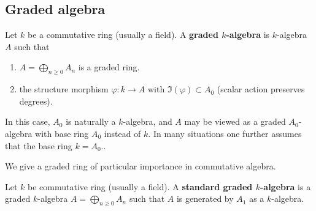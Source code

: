 \subsection{Graded algebra} %
\begin{definition}
    Let $k$ be a commutative ring (usually a field).
    A \textbf{graded $k$-algebra} is $k$-algebra $A$ such that
    \begin{enumerate}[label=(\roman*)]
        \item
              $A=\bigoplus_{n \geq 0} A_n$ is a graded ring.
        \item
              the structure morphism $\varphi : k \rightarrow A$ with $\Im(\varphi)\subset A_0$ (scalar action preserves degrees).
    \end{enumerate}
    \begin{remark}
        In this case, $A_0$ is naturally a $k$-algebra, and $A$ may be viewed as a graded $A_0$-algebra with base ring $A_0$ instead of $k$.
        In many situations one further assumes that the base ring $k=A_0$..
    \end{remark}
\end{definition}


We give a graded ring of particular importance in commutative algebra.
\begin{definition}
    Let $k$ be commutative ring (usually a field).
    A \textbf{standard graded $k$-algebra} is a graded $k$-algebra $A=\bigoplus_{n \geq 0} A_n$ such that
    $A$ is generated by $A_1$ as a $k$-algebra.
\end{definition}






